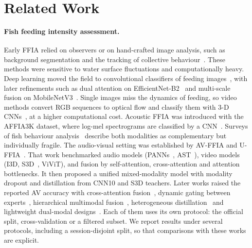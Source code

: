 \section{Related Work}
\label{sec:related}

\paragraph{Fish feeding intensity assessment.}
Early FFIA relied on observers or on hand-crafted image analysis, such as background segmentation and
the tracking of collective behaviour~\cite{zhao2017appetite}. These methods were sensitive to water
surface fluctuations and computationally heavy. Deep learning moved the field to convolutional
classifiers of feeding images~\cite{zhou2019ffia}, with later refinements such as dual attention on
EfficientNet-B2~\cite{yang2021effnetb2} and multi-scale fusion on MobileNetV3~\cite{zhang2023msif}.
Single images miss the dynamics of feeding, so video methods convert RGB sequences to optical flow and
classify them with 3-D CNNs~\cite{ubina2021ffia}, at a higher computational cost. Acoustic FFIA was
introduced with the AFFIA3K dataset, where log-mel spectrograms are classified by a CNN~\cite{cui2022affia3k}.
Surveys of fish behaviour analysis~\cite{an2021behaviour,yang2021smartfish} describe both modalities as
complementary but individually fragile. The audio-visual setting was established by AV-FFIA and
U-FFIA~\cite{cui2024uffia}. That work benchmarked audio models (PANNs~\cite{kong2020panns}, AST~\cite{gong2021ast}),
video models (I3D, S3D~\cite{xie2018s3d}, ViViT), and fusion by self-attention, cross-attention and
attention bottlenecks. It then proposed a unified mixed-modality model with modality dropout and
distillation from CNN10 and S3D teachers. Later works raised the reported AV accuracy with
cross-attention fusion~\cite{acafnet2025}, dynamic gating between experts~\cite{dynagate2026},
hierarchical multimodal fusion~\cite{hmmfnet2026}, heterogeneous distillation~\cite{hmkd2026} and
lightweight dual-modal designs~\cite{ldmf2026}. Each of them uses its own protocol: the official split,
cross-validation or a filtered subset. We report results under several protocols, including a
session-disjoint split, so that comparisons with these works are explicit.

